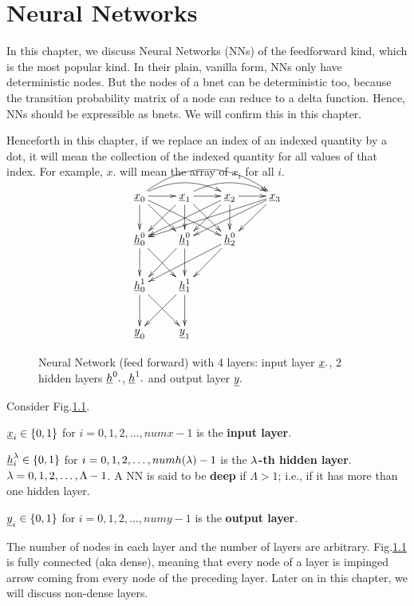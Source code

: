\chapter{Neural Networks}

In this chapter, we discuss
 Neural Networks (NNs) of the
feedforward kind,
which is the most popular kind. In their
 plain, vanilla form, NNs only
have deterministic nodes.
But the nodes of a bnet can
be deterministic too, because
the transition probability matrix
of a node
can reduce to a delta function.
Hence, NNs should be expressible
as bnets. We will confirm this
in this chapter.

Henceforth in this chapter,
if we replace an index of an
indexed quantity by a dot, 
it will mean the collection
of the indexed quantity
for all values of that
index. For example, $x.$
will mean the 
array of $x_i$ for all $i$.


\begin{figure}[h!]
\centering
$$\xymatrix{
\rvx_0\ar@/^1pc/[rr]
\ar@/^2pc/[rrr]
\ar[d]\ar[dr]\ar[drr]\ar[r]&
\rvx_1\ar@/^1pc/[rr]
 \ar[dl]\ar[d]\ar[dr]\ar[r]&
\rvx_2\ar[dll]\ar[dl]\ar[d]\ar[r]&
\rvx_3\ar[dlll]\ar[dll]\ar[dl]\\
\rvh_0^0\ar[d]\ar[dr]&
\rvh_1^0\ar[dl]\ar[d]&
\rvh_2^0\ar[dll]\ar[dl]\\
\rvh_0^1\ar[d]\ar[dr]&
\rvh_1^1\ar[dl]\ar[d]\\
\rvy_0&
\rvy_1
}$$
\caption{Neural Network (feed forward)
with 4 layers: input layer ${\underline{x}}.$,
2 hidden layers ${\underline{h}}^0.$,
${\underline{h}}^1.$ and
output layer ${\underline{y}}.$ }
\label{fig-nn}
\end{figure}

Consider Fig.\ref{fig-nn}.

${\underline{x}}_i\in 
\{0,1\}$ for 
$i=0, 1, 2, \dots,numx-1$
is the \textbf{input layer}.

${\underline{h}}_i^\lambda\in 
\{0,1\}$ for 
$i=0, 1, 2, \dots,numh(\lambda)-1$
is the $\lambda$\textbf{-th hidden layer}.
$\lambda=0, 1, 2, \ldots, \Lambda-1$.
A NN is said to be {\bf deep} if
$\Lambda>1$; i.e., if it has 
more than one hidden layer.

${\underline{y}}_i\in 
\{0,1\}$ for 
$i=0, 1, 2, \dots,numy-1$
is the \textbf{output layer}.

The number of nodes in each layer 
and the number of layers are arbitrary.
Fig.\ref{fig-nn} is fully connected 
(aka dense), meaning that every node
of a layer is impinged 
arrow coming 
from every node of the preceding
layer. Later on in this chapter,
we will
discuss non-dense layers.

